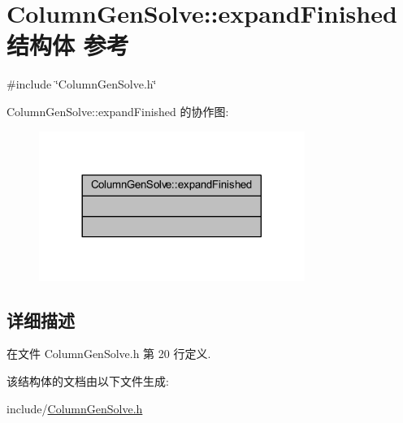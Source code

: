 \hypertarget{structColumnGenSolve_1_1expandFinished}{}\section{Column\+Gen\+Solve\+:\+:expand\+Finished结构体 参考}
\label{structColumnGenSolve_1_1expandFinished}


{\ttfamily \#include \char`\"{}Column\+Gen\+Solve.\+h\char`\"{}}



Column\+Gen\+Solve\+:\+:expand\+Finished 的协作图\+:
\nopagebreak
\begin{figure}[H]
\begin{center}
\leavevmode
\includegraphics[width=245pt]{structColumnGenSolve_1_1expandFinished__coll__graph}
\end{center}
\end{figure}


\subsection{详细描述}


在文件 Column\+Gen\+Solve.\+h 第 20 行定义.



该结构体的文档由以下文件生成\+:\begin{DoxyCompactItemize}
\item 
include/\hyperlink{ColumnGenSolve_8h}{Column\+Gen\+Solve.\+h}\end{DoxyCompactItemize}
